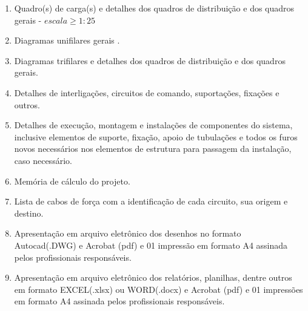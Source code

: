 \begin{enumerate}
		\item Quadro(s) de carga(s) e detalhes dos quadros de distribuição e dos quadros gerais - $escala \geq 1:25$

		\item Diagramas unifilares gerais .
		
		\item Diagramas trifilares e detalhes dos quadros de distribuição e dos quadros gerais.

		\item Detalhes de interligações, circuitos de comando, suportações, fixações e outros.

		\item Detalhes de execução, montagem e instalações de componentes do sistema, inclusive elementos de suporte, fixação, apoio de tubulações e todos os furos novos necessários nos elementos de estrutura para passagem da instalação, caso necessário.

		\item Memória de cálculo do projeto.

		\item Lista de cabos de força com a identificação de cada circuito, sua origem e destino.

		\item Apresentação em arquivo eletrônico dos desenhos no formato Autocad(.DWG) e Acrobat (pdf) e 01 impressão em formato A4 assinada pelos profissionais responsáveis.
		
		\item Apresentação em arquivo eletrônico dos relatórios, planilhas, dentre outros em formato EXCEL(.xlsx) ou WORD(.docx) e Acrobat (pdf) e 01 impressões em formato A4 assinada pelos profissionais responsáveis.

	\end{enumerate}


